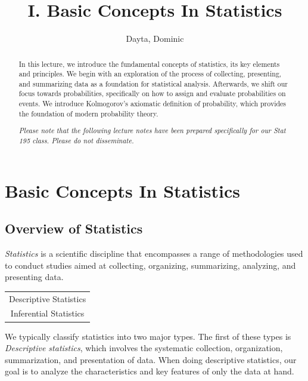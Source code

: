 \documentclass{article}
\title{I. Basic Concepts In Statistics}
\author{Dayta, Dominic}
\begin{document}
\begin{titlepage}
\thispagestyle{empty}
\maketitle

\begin{abstract}
In this lecture, we introduce the fundamental concepts of statistics, its key elements and principles. We begin with an exploration of the process of collecting, presenting, and summarizing data as a foundation for statistical analysis. Afterwards, we shift our focus towards probabilities, specifically on how to assign and evaluate probabilities on events. We introduce Kolmogorov's axiomatic definition of probability, which provides the foundation of modern probability theory.

\textit{Please note that the following lecture notes have been prepared specifically for our Stat 195 class. Please do not disseminate.}
\end{abstract}

\tableofcontents
\end{titlepage}



\section{Basic Concepts In Statistics}

\subsection{Overview of Statistics}

\emph{Statistics} is a scientific discipline that encompasses a range of methodologies used to conduct studies aimed at collecting, organizing, summarizing, analyzing, and presenting data.

\begin{margintable}
\begin{tabular}{c} 
    Descriptive Statistics \\
    Inferential Statistics
\end{tabular}
\end{margintable}

We typically classify statistics into two major types. The first of these types is \emph{Descriptive statistics}, which involves the systematic collection, organization, summarization, and presentation of data. When doing descriptive statistics, our goal is to analyze the characteristics and key features of only the data at hand.
\end{document}
